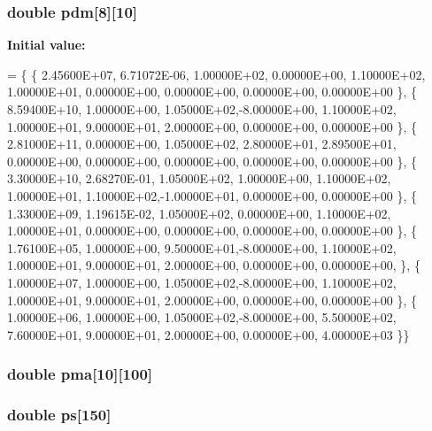 \hypertarget{nrlmsise-00__data_8c_ac7ac86294545f793edad8b9574d73132}{
\subsubsection[{pdm}]{\setlength{\rightskip}{0pt plus 5cm}double pdm\mbox{[}8\mbox{]}\mbox{[}10\mbox{]}}}\label{nrlmsise-00__data_8c_ac7ac86294545f793edad8b9574d73132}
{\bfseries Initial value\+:}
\begin{DoxyCode}
= \{
\{    2.45600E+07, 6.71072E-06, 1.00000E+02, 0.00000E+00, 1.10000E+02,
     1.00000E+01, 0.00000E+00, 0.00000E+00, 0.00000E+00, 0.00000E+00 \},
\{    8.59400E+10, 1.00000E+00, 1.05000E+02,-8.00000E+00, 1.10000E+02,
     1.00000E+01, 9.00000E+01, 2.00000E+00, 0.00000E+00, 0.00000E+00 \},
\{    2.81000E+11, 0.00000E+00, 1.05000E+02, 2.80000E+01, 2.89500E+01,
     0.00000E+00, 0.00000E+00, 0.00000E+00, 0.00000E+00, 0.00000E+00 \},
\{    3.30000E+10, 2.68270E-01, 1.05000E+02, 1.00000E+00, 1.10000E+02,
     1.00000E+01, 1.10000E+02,-1.00000E+01, 0.00000E+00, 0.00000E+00 \},
\{    1.33000E+09, 1.19615E-02, 1.05000E+02, 0.00000E+00, 1.10000E+02,
     1.00000E+01, 0.00000E+00, 0.00000E+00, 0.00000E+00, 0.00000E+00 \},
\{    1.76100E+05, 1.00000E+00, 9.50000E+01,-8.00000E+00, 1.10000E+02,
     1.00000E+01, 9.00000E+01, 2.00000E+00, 0.00000E+00, 0.00000E+00, \},
\{    1.00000E+07, 1.00000E+00, 1.05000E+02,-8.00000E+00, 1.10000E+02,
     1.00000E+01, 9.00000E+01, 2.00000E+00, 0.00000E+00, 0.00000E+00 \},
\{    1.00000E+06, 1.00000E+00, 1.05000E+02,-8.00000E+00, 5.50000E+02,
     7.60000E+01, 9.00000E+01, 2.00000E+00, 0.00000E+00, 4.00000E+03 \}\}
\end{DoxyCode}
\hypertarget{nrlmsise-00__data_8c_afc39d71d3e372c3178c33a31ee91d713}{
\subsubsection[{pma}]{\setlength{\rightskip}{0pt plus 5cm}double pma\mbox{[}10\mbox{]}\mbox{[}100\mbox{]}}}\label{nrlmsise-00__data_8c_afc39d71d3e372c3178c33a31ee91d713}
\hypertarget{nrlmsise-00__data_8c_ad4f203c6cf70efc738b56d4377ded829}{
\subsubsection[{ps}]{\setlength{\rightskip}{0pt plus 5cm}double ps\mbox{[}150\mbox{]}}}\label{nrlmsise-00__data_8c_ad4f203c6cf70efc738b56d4377ded829}
